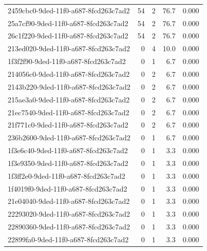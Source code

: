 \begin{longtable}{l r r r r}
2459cbc0-9ded-11f0-a687-8fcd263c7ad2 & 54 & 2 & 76.7 & 0.000 \\

25a7cf90-9ded-11f0-a687-8fcd263c7ad2 & 54 & 2 & 76.7 & 0.000 \\

26c1f220-9ded-11f0-a687-8fcd263c7ad2 & 54 & 2 & 76.7 & 0.000 \\

213ed020-9ded-11f0-a687-8fcd263c7ad2 & 0 & 4 & 10.0 & 0.000 \\

1f3f2f90-9ded-11f0-a687-8fcd263c7ad2 & 0 & 1 & 6.7 & 0.000 \\

214056c0-9ded-11f0-a687-8fcd263c7ad2 & 0 & 2 & 6.7 & 0.000 \\

2143b220-9ded-11f0-a687-8fcd263c7ad2 & 0 & 2 & 6.7 & 0.000 \\

215ae3a0-9ded-11f0-a687-8fcd263c7ad2 & 0 & 2 & 6.7 & 0.000 \\

21ec7540-9ded-11f0-a687-8fcd263c7ad2 & 0 & 2 & 6.7 & 0.000 \\

21f771c0-9ded-11f0-a687-8fcd263c7ad2 & 0 & 2 & 6.7 & 0.000 \\

236b2600-9ded-11f0-a687-8fcd263c7ad2 & 0 & 1 & 6.7 & 0.000 \\

1f3e6c40-9ded-11f0-a687-8fcd263c7ad2 & 0 & 1 & 3.3 & 0.000 \\

1f3e9350-9ded-11f0-a687-8fcd263c7ad2 & 0 & 1 & 3.3 & 0.000 \\

1f3ff2e0-9ded-11f0-a687-8fcd263c7ad2 & 0 & 1 & 3.3 & 0.000 \\

1f4019f0-9ded-11f0-a687-8fcd263c7ad2 & 0 & 1 & 3.3 & 0.000 \\

21e04040-9ded-11f0-a687-8fcd263c7ad2 & 0 & 1 & 3.3 & 0.000 \\

22293020-9ded-11f0-a687-8fcd263c7ad2 & 0 & 1 & 3.3 & 0.000 \\

22890360-9ded-11f0-a687-8fcd263c7ad2 & 0 & 1 & 3.3 & 0.000 \\

22899fa0-9ded-11f0-a687-8fcd263c7ad2 & 0 & 1 & 3.3 & 0.000 \\


\end{longtable}
